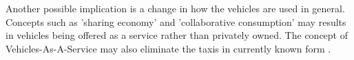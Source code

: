 \documentclass[11pt,english]{article}
\begin{document}
\par
Another possible implication is a change in how the vehicles are used in general. Concepts such as 'sharing economy' and 'collaborative consumption' may results in vehicles being offered as a service rather than privately owned. The concept of Vehicles-As-A-Service may also eliminate the taxis in currently known form  \citep{levinson2015climbing}.

























\end{document}
